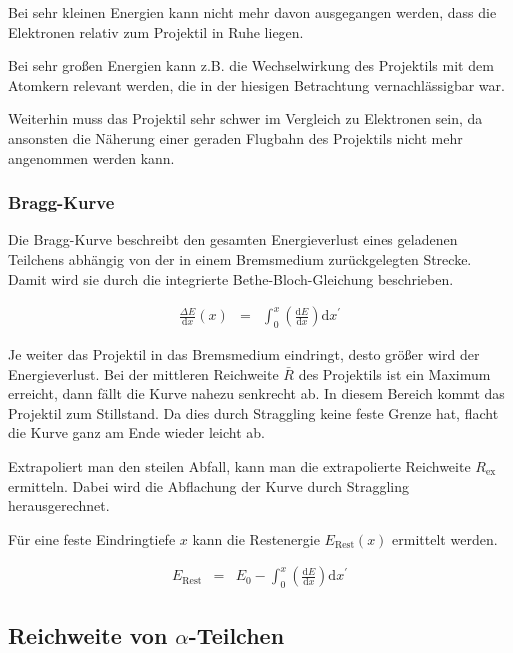 \documentclass[12pt,a4paper]{scrartcl}
\numberwithin{equation}{section} %
\renewcommand{\[}{} %
\renewcommand{\]}{\noindent} %
\begin{document}
Bei sehr kleinen Energien kann nicht mehr davon ausgegangen werden, dass
die Elektronen relativ zum Projektil in Ruhe liegen.

Bei sehr großen Energien kann z.B. die Wechselwirkung des Projektils mit
dem Atomkern relevant werden, die in der hiesigen Betrachtung
vernachlässigbar war.

Weiterhin muss das Projektil sehr schwer im Vergleich zu Elektronen
sein, da ansonsten die Näherung einer geraden Flugbahn des Projektils
nicht mehr angenommen werden kann.

\hypertarget{bragg-kurve}{%
\subsubsection{Bragg-Kurve}\label{bragg-kurve}}

Die Bragg-Kurve beschreibt den gesamten Energieverlust eines geladenen
Teilchens abhängig von der in einem Bremsmedium zurückgelegten Strecke.
Damit wird sie durch die integrierte Bethe-Bloch-Gleichung beschrieben.

\[
\begin{eqnarray}
    \frac{\Delta E}{\mathrm dx}(x) &=&
        \int_0^x \left(\frac{\mathrm dE}{\mathrm dx}\right) \mathrm dx^\prime
\end{eqnarray}
\]

Je weiter das Projektil in das Bremsmedium eindringt, desto größer wird
der Energieverlust. Bei der mittleren Reichweite \(\bar R\) des
Projektils ist ein Maximum erreicht, dann fällt die Kurve nahezu
senkrecht ab. In diesem Bereich kommt das Projektil zum Stillstand. Da
dies durch Straggling keine feste Grenze hat, flacht die Kurve ganz am
Ende wieder leicht ab.

Extrapoliert man den steilen Abfall, kann man die extrapolierte
Reichweite \(R_\mathrm{ex}\) ermitteln. Dabei wird die Abflachung der
Kurve durch Straggling herausgerechnet.

Für eine feste Eindringtiefe \(x\) kann die Restenergie
\(E_\mathrm{Rest}(x)\) ermittelt werden.

\[
\begin{eqnarray}
    E_\mathrm{Rest}
        &=& E_0
        - \int_0^x \left(\frac{\mathrm dE}{\mathrm dx}\right) \mathrm dx^\prime
        \label{Restenergie}
\end{eqnarray}
\]

\hypertarget{reichweite-von-alpha-teilchen}{%
\subsection{\texorpdfstring{Reichweite von
\(\alpha\)-Teilchen}{Reichweite von \textbackslash alpha-Teilchen}}\label{reichweite-von-alpha-teilchen}}
\end{document}

